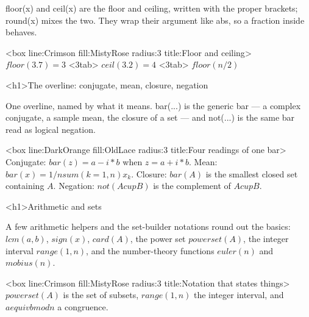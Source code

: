 \documentclass[
  margins=8,
  font=Latin Modern Roman,
  size=12,
  linespread=1.4,
  lang=en
]{scholatex}
\begin{document}
floor(x) and ceil(x) are the floor and ceiling, written with the
proper brackets; round(x) mixes the two. They wrap their argument like
abs, so a fraction inside behaves.

<box line:Crimson fill:MistyRose radius:3 title:{Floor and ceiling}>{
	$floor(3.7) = 3$ <3tab> $ceil(3.2) = 4$ <3tab> $floor(n/2)$
}

<h1>The overline: conjugate, mean, closure, negation

One overline, named by what it means. bar(...) is the generic bar — a
complex conjugate, a sample mean, the closure of a set — and not(...) is
the same bar read as logical negation.

<box line:DarkOrange fill:OldLace radius:3 title:{Four readings of one bar}>{
	Conjugate: $bar(z) = a - i*b$ when $z = a + i*b$.
	Mean: $bar(x) = 1/n sum(k=1, n) x_k$.
	Closure: $bar(A)$ is the smallest closed set containing $A$.
	Negation: $not(A cup B)$ is the complement of $A cup B$.
}

<h1>Arithmetic and sets

A few arithmetic helpers and the set-builder notations round out the basics:
$lcm(a, b)$, $sign(x)$, $card(A)$, the power set $powerset(A)$, the integer
interval $range(1, n)$, and the number-theory functions $euler(n)$ and
$mobius(n)$.

<box line:Crimson fill:MistyRose radius:3 title:{Notation that states things}>{
	$powerset(A)$ is the set of subsets, $range(1, n)$ the integer
	interval, and $a equiv b mod n$ a congruence.
}
\end{document}
